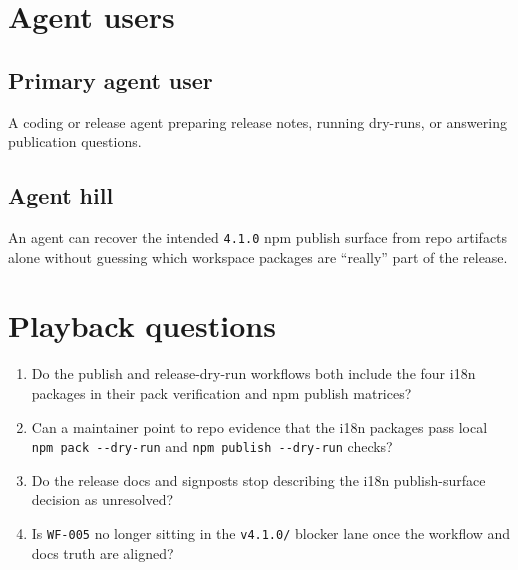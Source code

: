 \section{Agent users}\label{record-203-agent-users}

\subsection{Primary agent user}\label{record-203-primary-agent-user}

A coding or release agent preparing release notes, running dry-runs, or answering publication questions.

\subsection{Agent hill}\label{record-203-agent-hill}

An agent can recover the intended \texttt{4\allowbreak{}.\allowbreak{}1\allowbreak{}.\allowbreak{}0} npm publish surface from repo artifacts alone without guessing which workspace packages are ``really'' part of the release.

\section{Playback questions}\label{record-203-playback-questions}

\begin{enumerate}
\def\labelenumi{\arabic{enumi}.}
\tightlist
\item
  Do the publish and release-dry-run workflows both include the four i18n packages in their pack verification and npm publish matrices?
\item
  Can a maintainer point to repo evidence that the i18n packages pass local \texttt{n\allowbreak{}p\allowbreak{}m\allowbreak{} \allowbreak{}p\allowbreak{}a\allowbreak{}c\allowbreak{}k\allowbreak{} \allowbreak{}-\allowbreak{}-\allowbreak{}d\allowbreak{}r\allowbreak{}y\allowbreak{}-\allowbreak{}r\allowbreak{}u\allowbreak{}n} and \texttt{n\allowbreak{}p\allowbreak{}m\allowbreak{} \allowbreak{}p\allowbreak{}u\allowbreak{}b\allowbreak{}l\allowbreak{}i\allowbreak{}s\allowbreak{}h\allowbreak{} \allowbreak{}-\allowbreak{}-\allowbreak{}d\allowbreak{}r\allowbreak{}y\allowbreak{}-\allowbreak{}r\allowbreak{}u\allowbreak{}n} checks?
\item
  Do the release docs and signposts stop describing the i18n publish-surface decision as unresolved?
\item
  Is \texttt{W\allowbreak{}F\allowbreak{}-\allowbreak{}0\allowbreak{}0\allowbreak{}5} no longer sitting in the \texttt{v\allowbreak{}4\allowbreak{}.\allowbreak{}1\allowbreak{}.\allowbreak{}0\allowbreak{}/} blocker lane once the workflow and docs truth are aligned?
\end{enumerate}

